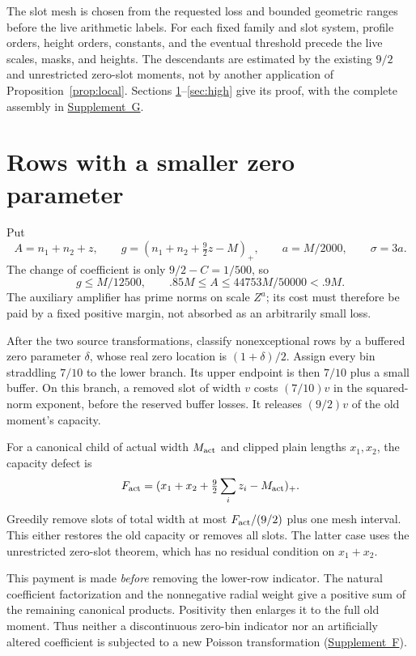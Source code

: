 \documentclass[11pt]{article}
\newcommand{\pos}[1]{(#1)_+}
\newcommand{\supp}[1]{\href{supplement.pdf}{Supplement~#1}}
\begin{document}
The slot mesh is chosen from the requested loss and bounded geometric
ranges before the live arithmetic labels. For each fixed family and slot
system, profile orders, height orders, constants, and the eventual
threshold precede the live scales, masks, and heights. The descendants
are estimated by the existing $9/2$ and unrestricted zero-slot moments,
not by another application of Proposition~\ref{prop:local}. Sections
\ref{sec:low}--\ref{sec:high} give its proof, with the complete assembly
in \supp{G}.

\section{Rows with a smaller zero parameter}\label{sec:low}

Put
\[
 A=n_1+n_2+z,\qquad
 g=\pos{n_1+n_2+\tfrac92z-M},\qquad a=M/2000,\qquad \sigma=3a.
\]
The change of coefficient is only $9/2-C=1/500$, so
\begin{equation}\label{eq:parent}
 g\le M/12500,
 \qquad .85M\le A\le44753M/50000<.9M.
\end{equation}
The auxiliary amplifier has prime norms on scale $Z^a$; its cost must
therefore be paid by a fixed positive margin, not absorbed as an
arbitrarily small loss.

After the two source transformations, classify nonexceptional rows by
a buffered zero parameter $\delta$, whose real zero location is
$(1+\delta)/2$. Assign every bin straddling $7/10$ to the lower branch.
Its upper endpoint is then $7/10$ plus a small buffer. On this branch,
a removed slot of width $v$ costs $(7/10)v$ in the squared-norm
exponent, before the reserved buffer losses. It releases $(9/2)v$ of the old moment's capacity.

For a canonical child of actual width $M_{\rm act}$ and clipped plain
lengths $x_1,x_2$, the capacity defect is
\[
 F_{\rm act}=\pos{x_1+x_2+\tfrac92\sum_i z_i-M_{\rm act}}.
\]
Greedily remove slots of total width at most $F_{\rm act}/(9/2)$ plus
one mesh interval. This either restores the old capacity or removes all
slots. The latter case uses the unrestricted zero-slot theorem, which
has no residual condition on $x_1+x_2$.

This payment is made \emph{before} removing the lower-row indicator.
The natural coefficient factorization and the nonnegative radial weight
give a positive sum of the remaining canonical products. Positivity
then enlarges it to the full old moment. Thus neither a discontinuous
zero-bin indicator nor an artificially altered coefficient is subjected
to a new Poisson transformation (\supp{F}).
\end{document}
